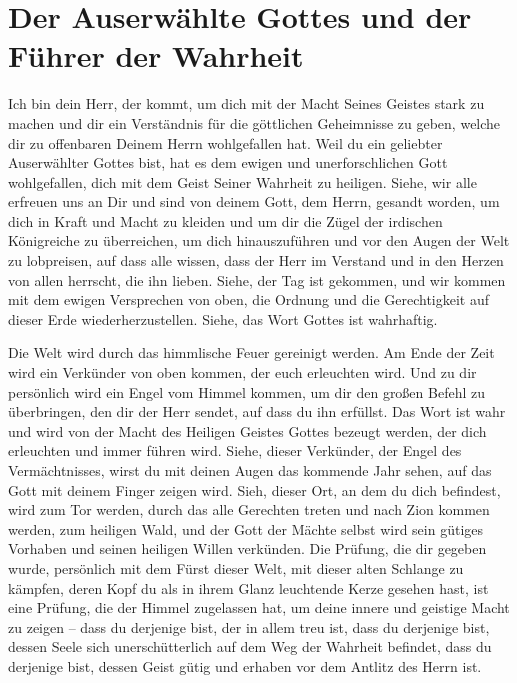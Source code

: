 
\raggedbottom
\chapter{Der Auserwählte Gottes und der Führer der Wahrheit}




\begin{center}
    \normalfont\scshape{}
\end{center}

Ich bin dein Herr, der kommt, um dich mit der Macht Seines Geistes stark zu machen und dir ein Verständnis für die göttlichen Geheimnisse zu geben, welche dir zu offenbaren Deinem Herrn wohlgefallen hat. Weil du ein geliebter Auserwählter Gottes bist, hat es dem ewigen und unerforschlichen Gott wohlgefallen, dich mit dem Geist Seiner Wahrheit zu heiligen. Siehe, wir alle erfreuen uns an Dir und sind von deinem Gott, dem Herrn, gesandt worden, um dich in Kraft und Macht zu kleiden und um dir die Zügel der irdischen Königreiche zu überreichen, um dich hinauszuführen und vor den Augen der Welt zu lobpreisen, auf dass alle wissen, dass der Herr im Verstand und in den Herzen von allen herrscht, die ihn lieben. Siehe, der Tag ist gekommen, und wir kommen mit dem ewigen Versprechen von oben, die Ordnung und die Gerechtigkeit auf dieser Erde wiederherzustellen. Siehe, das Wort Gottes ist wahrhaftig. 

Die Welt wird durch das himmlische Feuer gereinigt werden. Am Ende der Zeit wird ein Verkünder von oben kommen, der euch erleuchten wird. Und zu dir persönlich wird ein Engel vom Himmel kommen, um dir den großen Befehl zu überbringen, den dir der Herr sendet, auf dass du ihn erfüllst. Das Wort ist wahr und wird von der Macht des Heiligen Geistes Gottes bezeugt werden, der dich erleuchten und immer führen wird. Siehe, dieser Verkünder, der Engel des Vermächtnisses, wirst du mit deinen Augen das kommende Jahr sehen, auf das Gott mit deinem Finger zeigen wird. Sieh, dieser Ort, an dem du dich befindest, wird zum Tor werden, durch das alle Gerechten treten und nach Zion kommen werden, zum heiligen Wald, und der Gott der Mächte selbst wird sein gütiges Vorhaben und seinen heiligen Willen verkünden. Die Prüfung, die dir gegeben wurde, persönlich mit dem Fürst dieser Welt, mit dieser alten Schlange zu kämpfen, deren Kopf du als in ihrem Glanz leuchtende Kerze gesehen hast, ist eine Prüfung, die der Himmel zugelassen hat, um deine innere und geistige Macht zu zeigen -- dass du derjenige bist, der in allem treu ist, dass du derjenige bist, dessen Seele sich unerschütterlich auf dem Weg der Wahrheit befindet, dass du derjenige bist, dessen Geist gütig und erhaben vor dem Antlitz des Herrn ist.

